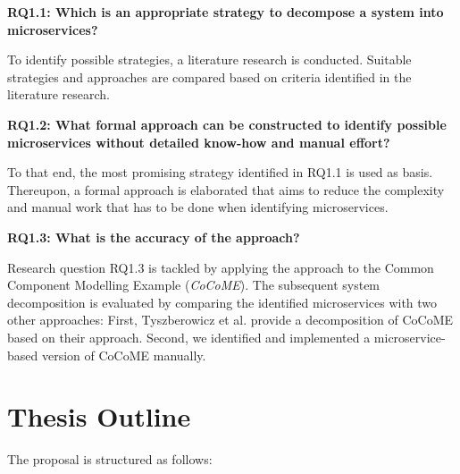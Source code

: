 \vspace{0.5cm}
\noindent
\textbf{RQ1.1: Which is an appropriate strategy to decompose a system into microservices?}

\vspace{0.5cm}
\noindent
To identify possible strategies, a literature research is conducted. Suitable strategies and approaches are compared based on criteria identified in the literature research.
\vspace{0.5cm}

\noindent
\textbf{RQ1.2: What formal approach can be constructed to identify possible microservices without detailed know-how and manual effort?}

\vspace{0.5cm}
\noindent
To that end, the most promising strategy identified in RQ1.1 is used as basis. Thereupon, a formal approach is elaborated that aims to reduce the complexity and manual work that has to be done when identifying microservices.
\vspace{0.5cm}


\noindent
\textbf{RQ1.3: What is the accuracy of the approach?   }

\vspace{0.5cm}
\noindent
Research question RQ1.3 is tackled by applying the approach to the Common Component Modelling Example (\textit{CoCoME}). The subsequent system decomposition is evaluated by comparing the identified microservices with two other approaches: First, Tyszberowicz et al. \cite{FunctionalDecompositionHeinrich} provide a decomposition of CoCoME based on their approach. Second, we identified and implemented a microservice-based version of CoCoME manually. 

\vspace{0.5cm}



\endgroup
\vspace{1cm}







\section{Thesis Outline}
\label{sec_Introduction:ThesisOutline}
The proposal is structured as follows:

